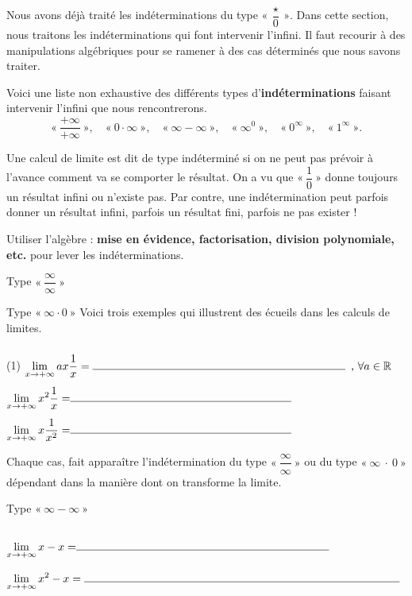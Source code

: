 \documentclass[a4paper,12pt]{article}
\begin{document}
Nous avons déjà traité les indéterminations du type $« ~\dfrac{\star}{0}~»$. Dans cette section, nous traitons les indéterminations qui font intervenir l'infini. Il faut recourir à des manipulations algébriques pour se ramener à des cas déterminés que nous savons traiter.


Voici une liste non exhaustive des différents types d’{\bfseries indéterminations} faisant intervenir l'infini que nous rencontrerons.
\[
 «~\dfrac{+\infty}{+\infty}~»,\quad
«~0\cdot\infty~»,\quad
 «~\infty - \infty~»,\quad
 «~\infty^0~»,\quad
 «~0^\infty~»,\quad
 «~1^\infty~».
\]

\begin{remarque}
	\tcblower
	Une calcul de limite est dit de type indéterminé si on ne peut pas prévoir à l’avance comment va se comporter le résultat. On a vu que 
\(«~\displaystyle\dfrac{1}{0}~»\)
donne toujours un résultat infini ou n'existe pas. Par contre, une indétermination peut parfois donner un résultat infini, parfois un résultat fini, parfois ne pas exister !

Utiliser l'algèbre : {\bfseries mise en évidence, factorisation, division polynomiale, etc.} pour lever les indéterminations.
\end{remarque}
\begin{exemple}
	Type $«~\dfrac{\infty}{\infty}~»$

	\vspace{1cm}

	Type $«~\infty \cdot 0~»$
	\tcblower
	Voici trois exemples qui illustrent des écueils dans les calculs de limites.
	\begin{tasks}(1)
		\task[] $\displaystyle{\lim_{x\rightarrow +\infty}ax\dfrac{1}{x}}=\ligne{8}, \, \forall a\in \mathbb{R}$
		\task[] $\displaystyle{\lim_{x\rightarrow +\infty}x^2\dfrac{1}{x}=}\ligne{7}$
		\task[] $\displaystyle{\lim_{x\rightarrow +\infty}x\dfrac{1}{x^2}=}\ligne{7}$
	\end{tasks}
	Chaque cas, fait apparaître l'indétermination du type $«~\dfrac{\infty}{\infty}~»$ ou du type $«~\infty~\cdot~0~»$ dépendant dans la manière dont on transforme la limite. 
\end{exemple}
\begin{exemple}
	Type $«~\infty-\infty~»$
	\tcblower
	\begin{tasks}
		\task $\displaystyle{\lim_{x\rightarrow +\infty}x-x=}\ligne{8}$
		\task $\displaystyle{\lim_{x\rightarrow +\infty}x^2-x}=\ligne{10}$ 
	\end{tasks}
\end{exemple}
\end{document}
